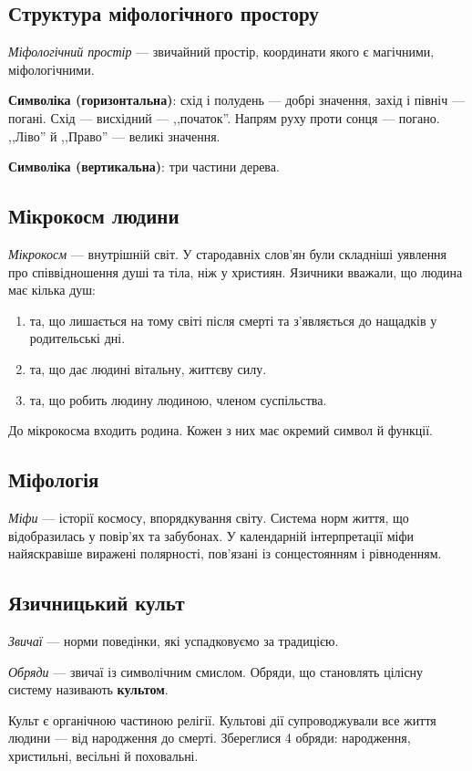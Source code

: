\documentclass[a5paper,10pt,titlepage,pdftex,headsepline]{scrartcl}
\begin{document}
\subsection{Структура міфологічного простору}
\textit{Міфологічний простір} --- звичайний простір, координати якого є магічними, міфологічними.

\textbf{Символіка (горизонтальна)}: схід і полудень --- добрі значення, захід і північ --- погані.
Схід --- висхідний --- ,,початок''.
Напрям руху проти сонця --- погано.
,,Ліво'' й ,,Право'' --- великі значення.

\textbf{Символіка (вертикальна)}: три частини дерева.

\subsection{Мікрокосм людини}
\textit{Мікрокосм} --- внутрішній світ.
У стародавніх слов’ян були складніші уявлення про співвідношення душі та тіла, ніж у християн.
Язичники вважали, що людина має кілька душ:
\begin{enumerate}
	\item та, що лишається на тому світі після смерті та з’являється до нащадків у родительські дні.
	\item та, що дає людині вітальну, життєву силу.
	\item та, що робить людину людиною, членом суспільства.
\end{enumerate}
До мікрокосма входить родина. Кожен з них має окремий символ й функції.
\subsection{Міфологія}
\textit{Міфи} --- історії космосу, впорядкування світу. Система норм життя, що відобразилась у повір’ях та забубонах.
У календарній інтерпретації міфи найяскравіше виражені полярності, пов’язані із сонцестоянням і рівноденням.
\subsection{Язичницький культ}
\textit{Звичаї} --- норми поведінки, які успадковуємо за традицією.

\textit{Обряди} --- звичаї із символічним смислом.
Обряди, що становлять цілісну систему називають \textbf{культом}.

Культ є органічною частиною релігії.
Культові дії супроводжували все життя людини --- від народження до смерті.
Збереглися 4 обряди: народження, христильні, весільні й поховальні.
\end{document}
